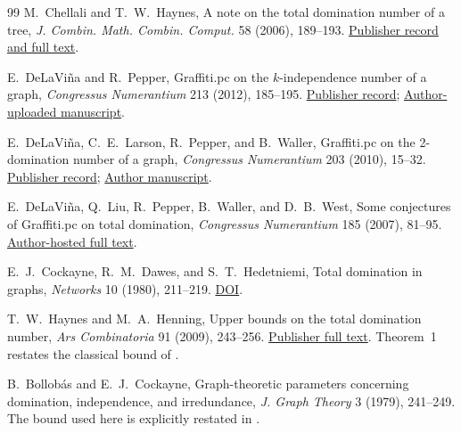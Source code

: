 \documentclass[11pt,a4paper]{article}
\theoremstyle{remark}
\begin{document}
\begin{thebibliography}{99}
M.~Chellali and T.~W.~Haynes,
A note on the total domination number of a tree,
\emph{J. Combin. Math. Combin. Comput.} 58 (2006), 189--193.
\href{https://combinatorialpress.com/jcmcc-articles/volume-058/a-note-on-the-total-domination-number-of-a-tree/}{Publisher record and full text}.

E.~DeLaVi\~na and R.~Pepper,
Graffiti.pc on the $k$-independence number of a graph,
\emph{Congressus Numerantium} 213 (2012), 185--195.
\href{https://combinatorialpress.com/cn/vol213/}{Publisher record};
\href{https://www.researchgate.net/publication/281573028_Graffitipc_on_the_k-independence_number_of_a_graph}{Author-uploaded manuscript}.

E.~DeLaVi\~na, C.~E.~Larson, R.~Pepper, and B.~Waller,
Graffiti.pc on the 2-domination number of a graph,
\emph{Congressus Numerantium} 203 (2010), 15--32.
\href{https://combinatorialpress.com/cn/vol203/}{Publisher record};
\href{https://math1um.github.io/Research/r07.pdf}{Author manuscript}.



E.~DeLaVi\~na, Q.~Liu, R.~Pepper, B.~Waller, and D.~B.~West,
Some conjectures of Graffiti.pc on total domination,
\emph{Congressus Numerantium} 185 (2007), 81--95.
\href{https://www.uhd.edu/documents/academics/sciences/total-dom-2007.pdf}{Author-hosted full text}.

E.~J.~Cockayne, R.~M.~Dawes, and S.~T.~Hedetniemi,
Total domination in graphs, \emph{Networks} 10 (1980), 211--219.
\href{https://doi.org/10.1002/net.3230100304}{DOI}.

T.~W.~Haynes and M.~A.~Henning,
Upper bounds on the total domination number,
\emph{Ars Combinatoria} 91 (2009), 243--256.
\href{https://combinatorialpress.com/article/ars/Volume\%20091/volume-91-paper-21.pdf}{Publisher full text}.
Theorem~1 restates the classical bound of \cite{CDH1980}.


B.~Bollob\'as and E.~J.~Cockayne,
Graph-theoretic parameters concerning domination, independence, and irredundance,
\emph{J. Graph Theory} 3 (1979), 241--249.
The bound used here is explicitly restated in \cite[Theorem~1]{FK20}.


\end{thebibliography}
\end{document}
